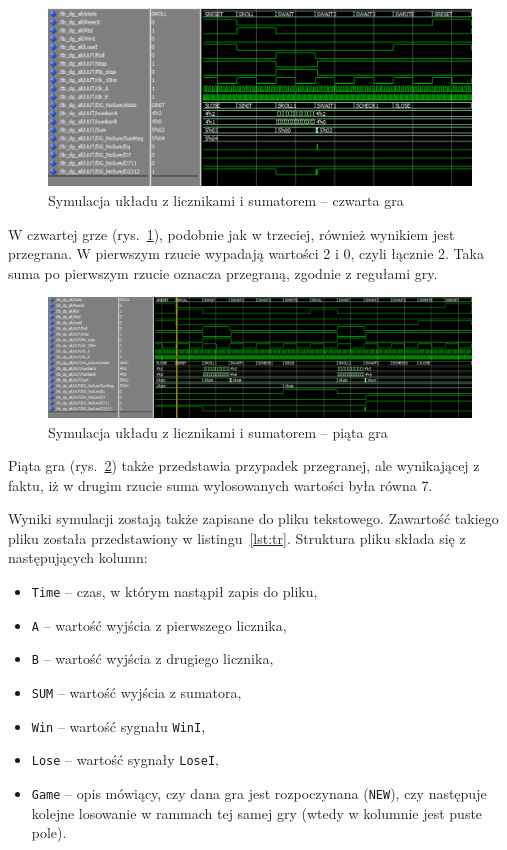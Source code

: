 \documentclass[a4paper,11pt,fleqn]{article}
\begin{document}
\begin{figure}[h]
\centering
\includegraphics[scale = 0.5]{screens/czwarta_gra.png}
\caption{Symulacja układu z licznikami i sumatorem -- czwarta gra}
\label{czwarta_gra}
\end{figure}

W czwartej grze (rys.~\ref{czwarta_gra}), podobnie jak w trzeciej, również wynikiem jest przegrana. W pierwszym rzucie wypadają wartości 2 i 0, czyli łącznie 2. Taka suma po pierwszym rzucie oznacza przegraną, zgodnie z regułami gry.

\begin{figure}[h]
\centering
\includegraphics[scale = 0.5]{screens/piata_gra.png}
\caption{Symulacja układu z licznikami i sumatorem -- piąta gra}
\label{piata_gra}
\end{figure}

Piąta gra (rys.~\ref{piata_gra}) także przedstawia przypadek przegranej, ale wynikającej z faktu, iż w drugim rzucie suma wylosowanych wartości była równa 7.


Wyniki symulacji zostają także zapisane do pliku tekstowego. Zawartość takiego pliku została przedstawiony w listingu~\ref{lst:tr}. Struktura pliku składa się z następujących kolumn:
\begin{itemize}
\item \texttt{Time} -- czas, w którym nastąpił zapis do pliku,
\item \texttt{A} -- wartość wyjścia z pierwszego licznika,
\item \texttt{B} -- wartość wyjścia z drugiego licznika,
\item \texttt{SUM} -- wartość wyjścia z sumatora,
\item \texttt{Win} -- wartość sygnału \texttt{WinI},
\item \texttt{Lose} -- wartość sygnały \texttt{LoseI},
\item \texttt{Game} -- opis mówiący, czy dana gra jest rozpoczynana (\texttt{NEW}), czy następuje kolejne losowanie w rammach tej samej gry (wtedy w kolumnie jest puste pole).
\end{itemize}
\end{document}
